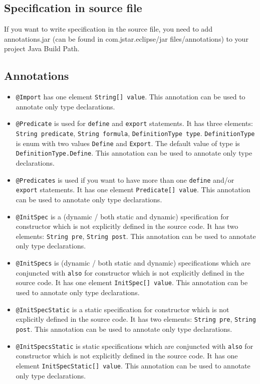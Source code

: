 \documentclass{article}
\begin{document}
\subsection*{Specification in source file}

If you want to write specification in the source file, you need to add annotations.jar (can be found in com.jstar.eclipse/jar files/annotations) to your project Java Build Path.

\subsection*{Annotations}

\begin{itemize}
\item \texttt{@Import} has one element \texttt{String[] value}. This annotation can be used to annotate only type declarations.
\item \texttt{@Predicate} is used for \texttt{define} and \texttt{export} statements. It has three elements: \texttt{String predicate}, \texttt{String formula}, \texttt{DefinitionType type}. \texttt{DefinitionType} is enum with two values \texttt{Define} and \texttt{Export}.  The default value of type is \texttt{DefinitionType.Define}. This annotation can be used to annotate only type declarations.
\item \texttt{@Predicates} is used if you want to have more than one  \texttt{define} and/or \texttt{export} statements. It has one element \texttt{Predicate[] value}. This annotation can be used to annotate only type declarations.
\item \texttt{@InitSpec} is a (dynamic / both static and dynamic) specification for constructor which is not explicitly defined in the source code. It has two elements: \texttt{String pre}, \texttt{String post}. This annotation can be used to annotate only type declarations.
\item \texttt{@InitSpecs} is (dynamic / both static and dynamic) specifications which are conjuncted with \texttt{also} for constructor which is not explicitly defined in the source code. It has one element \texttt{InitSpec[] value}. This annotation can be used to annotate only type declarations.
\item \texttt{@InitSpecStatic} is a static specification for constructor which is not explicitly defined in the source code. It has two elements: \texttt{String pre}, \texttt{String post}. This annotation can be used to annotate only type declarations.
\item \texttt{@InitSpecsStatic} is static specifications which are conjuncted with \texttt{also} for constructor which is not explicitly defined in the source code. It has one element \texttt{InitSpecStatic[] value}. This annotation can be used to annotate only type declarations.

\end{itemize}
\end{document}
